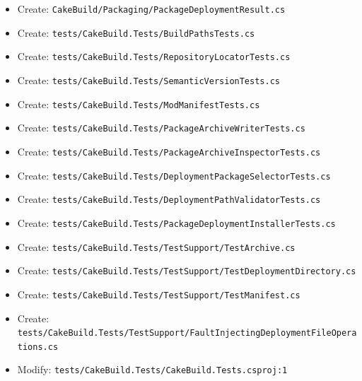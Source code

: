 \documentclass[
  10pt,
  letterpaper,
]{article}
\begin{document}
\begin{itemize}
\item
  Create:
  \texttt{CakeBuild/}\allowbreak{}\texttt{Packaging/}\allowbreak{}\texttt{PackageDeploymentResult.}\allowbreak{}\texttt{cs}
\item
  Create:
  \texttt{tests/}\allowbreak{}\texttt{CakeBuild.}\allowbreak{}\texttt{Tests/}\allowbreak{}\texttt{BuildPathsTests.}\allowbreak{}\texttt{cs}
\item
  Create:
  \texttt{tests/}\allowbreak{}\texttt{CakeBuild.}\allowbreak{}\texttt{Tests/}\allowbreak{}\texttt{RepositoryLocatorTests.}\allowbreak{}\texttt{cs}
\item
  Create:
  \texttt{tests/}\allowbreak{}\texttt{CakeBuild.}\allowbreak{}\texttt{Tests/}\allowbreak{}\texttt{SemanticVersionTests.}\allowbreak{}\texttt{cs}
\item
  Create:
  \texttt{tests/}\allowbreak{}\texttt{CakeBuild.}\allowbreak{}\texttt{Tests/}\allowbreak{}\texttt{ModManifestTests.}\allowbreak{}\texttt{cs}
\item
  Create:
  \texttt{tests/}\allowbreak{}\texttt{CakeBuild.}\allowbreak{}\texttt{Tests/}\allowbreak{}\texttt{PackageArchiveWriterTests.}\allowbreak{}\texttt{cs}
\item
  Create:
  \texttt{tests/}\allowbreak{}\texttt{CakeBuild.}\allowbreak{}\texttt{Tests/}\allowbreak{}\texttt{PackageArchiveInspectorTests.}\allowbreak{}\texttt{cs}
\item
  Create:
  \texttt{tests/}\allowbreak{}\texttt{CakeBuild.}\allowbreak{}\texttt{Tests/}\allowbreak{}\texttt{DeploymentPackageSelectorTests.}\allowbreak{}\texttt{cs}
\item
  Create:
  \texttt{tests/}\allowbreak{}\texttt{CakeBuild.}\allowbreak{}\texttt{Tests/}\allowbreak{}\texttt{DeploymentPathValidatorTests.}\allowbreak{}\texttt{cs}
\item
  Create:
  \texttt{tests/}\allowbreak{}\texttt{CakeBuild.}\allowbreak{}\texttt{Tests/}\allowbreak{}\texttt{PackageDeploymentInstallerTests.}\allowbreak{}\texttt{cs}
\item
  Create:
  \texttt{tests/}\allowbreak{}\texttt{CakeBuild.}\allowbreak{}\texttt{Tests/}\allowbreak{}\texttt{TestSupport/}\allowbreak{}\texttt{TestArchive.}\allowbreak{}\texttt{cs}
\item
  Create:
  \texttt{tests/}\allowbreak{}\texttt{CakeBuild.}\allowbreak{}\texttt{Tests/}\allowbreak{}\texttt{TestSupport/}\allowbreak{}\texttt{TestDeploymentDirectory.}\allowbreak{}\texttt{cs}
\item
  Create:
  \texttt{tests/}\allowbreak{}\texttt{CakeBuild.}\allowbreak{}\texttt{Tests/}\allowbreak{}\texttt{TestSupport/}\allowbreak{}\texttt{TestManifest.}\allowbreak{}\texttt{cs}
\item
  Create:
  \texttt{tests/}\allowbreak{}\texttt{CakeBuild.}\allowbreak{}\texttt{Tests/}\allowbreak{}\texttt{TestSupport/}\allowbreak{}\texttt{FaultInjectingDeploymentFileOperations.}\allowbreak{}\texttt{cs}
\item
  Modify:
  \texttt{tests/}\allowbreak{}\texttt{CakeBuild.}\allowbreak{}\texttt{Tests/}\allowbreak{}\texttt{CakeBuild.}\allowbreak{}\texttt{Tests.}\allowbreak{}\texttt{csproj:}\allowbreak{}\texttt{1}
\end{itemize}
\end{document}
